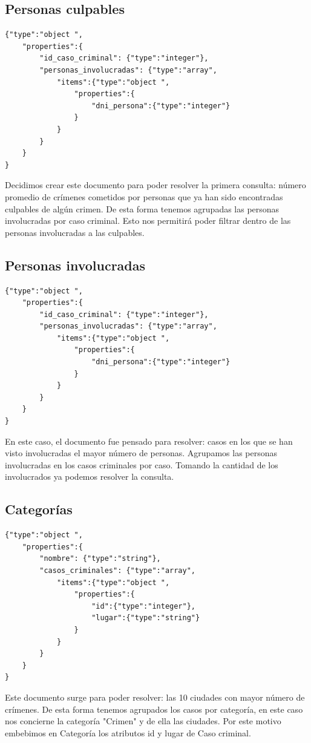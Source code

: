 \documentclass[10pt,a4paper]{article}
\begin{document}
\subsection{Personas culpables}
\begin{lstlisting}
{"type":"object ",
	"properties":{
		"id_caso_criminal": {"type":"integer"},
		"personas_involucradas": {"type":"array",
			"items":{"type":"object ",
				"properties":{
					"dni_persona":{"type":"integer"}
				}
			}
		}
	}
}
\end{lstlisting}

Decidimos crear este documento para poder resolver la primera consulta: número promedio de crímenes cometidos por personas que ya han sido encontradas culpables de algún crimen.
De esta forma tenemos agrupadas las personas involucradas por caso criminal. Esto nos permitirá poder filtrar dentro de las personas involucradas a las culpables.

\subsection{Personas involucradas}
\begin{lstlisting}
{"type":"object ",
	"properties":{
		"id_caso_criminal": {"type":"integer"},
		"personas_involucradas": {"type":"array",
			"items":{"type":"object ",
				"properties":{
					"dni_persona":{"type":"integer"}
				}
			}
		}
	}
}
\end{lstlisting}
En este caso, el documento fue pensado para resolver: casos en los que se han visto involucradas el mayor número de personas. Agrupamos las personas involucradas en los casos criminales por caso. Tomando la cantidad de los involucrados ya podemos resolver la consulta.

\subsection{Categorías}
\begin{lstlisting}
{"type":"object ",
	"properties":{
		"nombre": {"type":"string"},
		"casos_criminales": {"type":"array",
			"items":{"type":"object ",
				"properties":{
					"id":{"type":"integer"},
					"lugar":{"type":"string"}
				}
			}
		}
	}
}
\end{lstlisting}
Este documento surge para poder resolver: las 10 ciudades con mayor número de crímenes. De esta forma tenemos agrupados los casos por categoría, en este caso nos concierne la categoría "Crimen" y de ella las ciudades. Por este motivo embebimos en Categoría los atributos id y lugar de Caso criminal.
\end{document}
